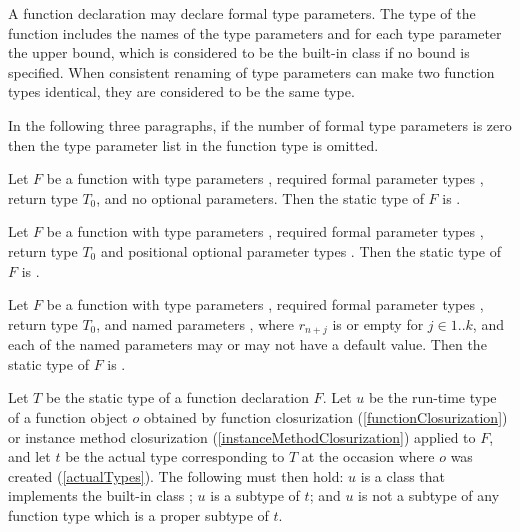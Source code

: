 \documentclass[makeidx]{article}
\begin{document}
\LMHash{}%
A function declaration may declare formal type parameters.
The type of the function includes the names of the type parameters
and for each type parameter the upper bound,
which is considered to be the built-in class 
if no bound is specified.
When consistent renaming of type parameters
can make two function types identical,
they are considered to be the same type.


\LMHash{}%
In the following three paragraphs,
if the number  of formal type parameters is zero then
the type parameter list in the function type is omitted.

\LMHash{}%
Let $F$ be a function with
type parameters \TypeParametersStd,
required formal parameter types ,
return type $T_0$,
and no optional parameters.
Then the static type of $F$ is
.

\LMHash{}%
Let $F$ be a function with
type parameters \TypeParametersStd,
required formal parameter types ,
return type $T_0$
and positional optional parameter types .
Then the static type of $F$ is
.

\LMHash{}%
Let $F$ be a function with
type parameters \TypeParametersStd,
required formal parameter types ,
return type $T_0$,
and named parameters ,
where $r_{n+j}$ is \REQUIRED{} or empty for $j \in 1 .. k$,
and each of the named parameters may or may not have a default value.
Then the static type of $F$ is
.

\LMHash{}%
Let $T$ be the static type of a function declaration $F$.
Let $u$ be the run-time type of a function object $o$ obtained by
function closurization
(\ref{functionClosurization})
or instance method closurization
(\ref{instanceMethodClosurization})
applied to $F$,
and let $t$ be the actual type corresponding to $T$
at the occasion where $o$ was created
(\ref{actualTypes}).
The following must then hold:
$u$ is a class that implements the built-in class \FUNCTION;
$u$ is a subtype of $t$;
and $u$ is not a subtype of any function type which is a proper subtype of $t$.
\end{document}
